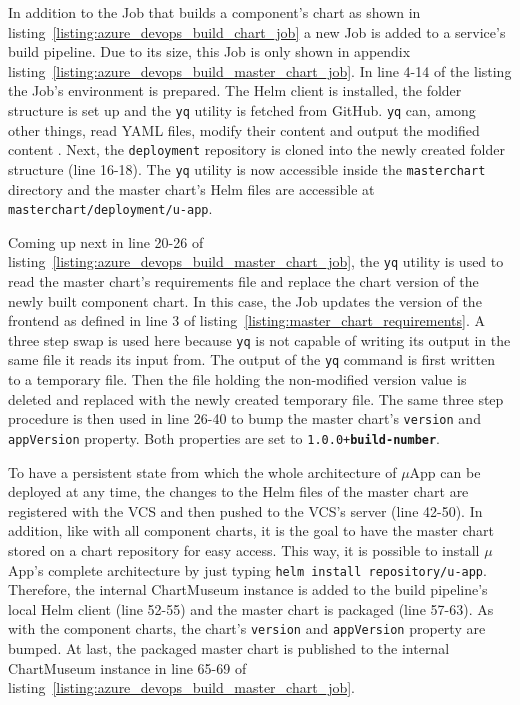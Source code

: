 In addition to the Job that builds a component's chart as shown in
listing~\ref{listing:azure_devops_build_chart_job} a new Job is added to a
service's build pipeline. Due to its size, this Job is only shown in appendix
listing~\ref{listing:azure_devops_build_master_chart_job}. In line 4-14 of the
listing the Job's environment is prepared. The Helm client is installed, the
folder structure is set up and the \texttt{yq} utility is fetched from GitHub.
\texttt{yq} can, among other things, read YAML files, modify their content and
output the modified content \autocite{Farahyq2017}. Next, the
\texttt{deployment} repository is cloned into the newly created folder
structure (line 16-18). The \texttt{yq} utility is now accessible inside the
\texttt{master\textunderscore chart} directory and the master chart's Helm
files are accessible at \texttt{master\textunderscore chart/deployment/u-app}.

Coming up next in line 20-26 of
listing~\ref{listing:azure_devops_build_master_chart_job}, the \texttt{yq}
utility is used to read the master chart's requirements file and replace the
chart version of the newly built component chart. In this case, the Job updates
the version of the frontend as defined in line 3 of
listing~\ref{listing:master_chart_requirements}. A three step swap is used here
because \texttt{yq} is not capable of writing its output in the same file it
reads its input from. The output of the \texttt{yq} command is first written to
a temporary file. Then the file holding the non-modified version value is
deleted and replaced with the newly created temporary file. The same three step
procedure is then used in line 26-40 to bump the master chart's
\texttt{version} and \texttt{appVersion} property. Both properties are set to
\texttt{1.0.0+\textbf{build-number}}.

To have a persistent state from which the whole architecture of $\mu$App can be
deployed at any time, the changes to the Helm files of the master chart are
registered with the \ac{VCS} and then pushed to the \ac{VCS}'s server (line
42-50). In addition, like with all component charts, it is the goal to have the
master chart stored on a chart repository for easy access. This way, it is
possible to install $\mu$App's complete architecture by just typing
\texttt{helm install repository/u-app}. Therefore, the internal ChartMuseum
instance is added to the build pipeline's local Helm client (line 52-55) and
the master chart is packaged (line 57-63). As with the component charts, the
chart's \texttt{version} and \texttt{appVersion} property are bumped. At last,
the packaged master chart is published to the internal ChartMuseum instance in
line 65-69 of listing~\ref{listing:azure_devops_build_master_chart_job}.

